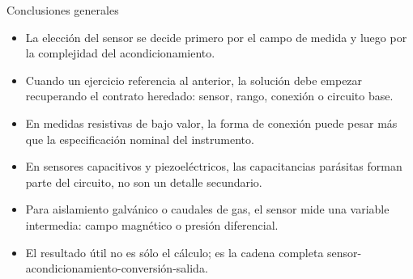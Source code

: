 \documentclass[aspectratio=169,9pt]{beamer}
\begin{document}
\begin{frame}{Conclusiones generales}
  \begin{itemize}
    \item La elección del sensor se decide primero por el campo de medida y luego por la complejidad del acondicionamiento.
    \item Cuando un ejercicio referencia al anterior, la solución debe empezar recuperando el contrato heredado: sensor, rango, conexión o circuito base.
    \item En medidas resistivas de bajo valor, la forma de conexión puede pesar más que la especificación nominal del instrumento.
    \item En sensores capacitivos y piezoeléctricos, las capacitancias parásitas forman parte del circuito, no son un detalle secundario.
    \item Para aislamiento galvánico o caudales de gas, el sensor mide una variable intermedia: campo magnético o presión diferencial.
    \item El resultado útil no es sólo el cálculo; es la cadena completa sensor-acondicionamiento-conversión-salida.
  \end{itemize}
\end{frame}
\end{document}
